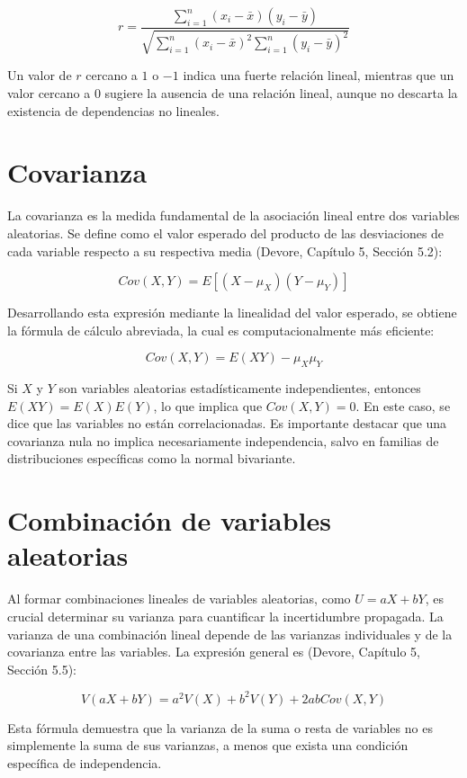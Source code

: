 $$ r = \frac{\sum_{i=1}^{n} (x_i - \bar{x})(y_i - \bar{y})}{\sqrt{\sum_{i=1}^{n} (x_i - \bar{x})^2 \sum_{i=1}^{n} (y_i - \bar{y})^2}} $$

Un valor de $r$ cercano a $1$ o $-1$ indica una fuerte relación lineal, mientras que un valor cercano a $0$ sugiere la ausencia de una relación lineal, aunque no descarta la existencia de dependencias no lineales.

\section{Covarianza}

La covarianza es la medida fundamental de la asociación lineal entre dos variables aleatorias. Se define como el valor esperado del producto de las desviaciones de cada variable respecto a su respectiva media (Devore, Capítulo 5, Sección 5.2):

$$ Cov(X,Y) = E[(X-\mu_X)(Y-\mu_Y)] $$

Desarrollando esta expresión mediante la linealidad del valor esperado, se obtiene la fórmula de cálculo abreviada, la cual es computacionalmente más eficiente:

$$ Cov(X,Y) = E(XY) - \mu_X \mu_Y $$

Si $X$ y $Y$ son variables aleatorias estadísticamente independientes, entonces $E(XY) = E(X)E(Y)$, lo que implica que $Cov(X,Y) = 0$. En este caso, se dice que las variables no están correlacionadas. Es importante destacar que una covarianza nula no implica necesariamente independencia, salvo en familias de distribuciones específicas como la normal bivariante.

\section{Combinación de variables aleatorias}

Al formar combinaciones lineales de variables aleatorias, como $U = aX + bY$, es crucial determinar su varianza para cuantificar la incertidumbre propagada. La varianza de una combinación lineal depende de las varianzas individuales y de la covarianza entre las variables. La expresión general es (Devore, Capítulo 5, Sección 5.5):

$$ V(aX + bY) = a^2V(X) + b^2V(Y) + 2abCov(X,Y) $$

Esta fórmula demuestra que la varianza de la suma o resta de variables no es simplemente la suma de sus varianzas, a menos que exista una condición específica de independencia. 

